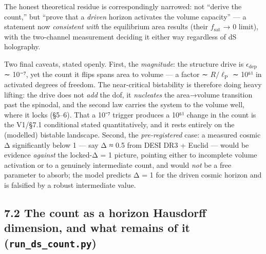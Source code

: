 \documentclass[
  10pt,
]{article}
\begin{document}
The honest theoretical residue is correspondingly narrowed: not ``derive
the count,'' but ``prove that a \emph{driven} horizon activates the
volume capacity'' --- a statement now \emph{consistent with} the
equilibrium area results (their \(f_{\mathrm{sat}}\) → 0 limit), with
the two-channel measurement deciding it either way regardless of dS
holography.

Two final caveats, stated openly. First, the \emph{magnitude}: the
structure drive is \(\epsilon _{\mathrm{dep}}\) ∼ 10⁻⁷, yet the count it
flips spans area to volume --- a factor ∼ \(R/\ell _{\mathrm{P}}\) ∼
10⁶¹ in activated degrees of freedom. The near-critical bistability is
therefore doing heavy lifting: the drive does not \emph{add} the dof, it
\emph{nucleates} the area→volume transition past the spinodal, and the
second law carries the system to the volume well, where it locks
(§5--6). That a 10⁻⁷ trigger produces a 10⁶¹ change in the count is the
V1/§7.1 conditional stated quantitatively, and it rests entirely on the
(modelled) bistable landscape. Second, the \emph{pre-registered} case: a
measured cosmic Δ significantly below 1 --- say Δ ≈ 0.5 from DESI DR3 +
Euclid --- would be evidence \emph{against} the locked-Δ = 1 picture,
pointing either to incomplete volume activation or to a genuinely
intermediate count, and would \emph{not} be a free parameter to absorb;
the model predicts Δ = 1 for the driven cosmic horizon and is falsified
by a robust intermediate value.

\subsection{\texorpdfstring{7.2 The count as a horizon Hausdorff
dimension, and what remains of it
(\texttt{run\_ds\_count.py})}{7.2 The count as a horizon Hausdorff dimension, and what remains of it (run\_ds\_count.py)}}\label{the-count-as-a-horizon-hausdorff-dimension-and-what-remains-of-it-run_ds_count.py}
\end{document}
